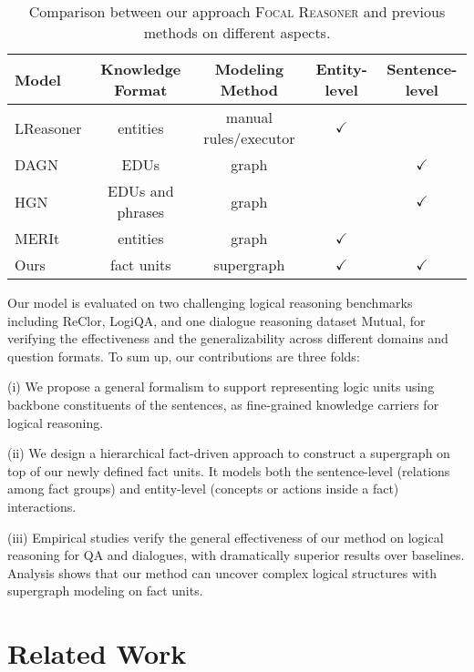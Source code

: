 \documentclass[11pt]{article}
\newcommand{\okmark}{{\textbf{\textcolor[rgb]{0.1, 0.5, 0.1}{$\checkmark$}}}}
\newcommand{\ngmark}{{\textbf{\color{red}{\ding{55}}}}}
\begin{document}
\begin{table*}
\centering
\setlength{\belowcaptionskip}{2 pt}
\small
\setlength{\tabcolsep}{9 pt}
\begin{tabular}{lcccc}
    \toprule
    Model    & Knowledge Format & Modeling Method & Entity-level & Sentence-level\\
    \midrule
    LReasoner \cite{wang2021logic} &entities&manual rules/executor&\okmark& \ngmark \\
    DAGN \cite{zhang2021video} & EDUs & graph &\ngmark &\okmark\\
    HGN \cite{chen-etal-2022-modeling-hierarchical} & EDUs and phrases & graph & \ngmark & \okmark\\
    MERIt \cite{jiao2022merit} & entities & graph &\okmark& \ngmark \\
    \midrule
    Ours & fact units & supergraph &\okmark &\okmark \\
    \bottomrule
\end{tabular}
  \caption{Comparison between our approach \textsc{Focal Reasoner} and previous methods on different aspects.}\label{related-work}
\vspace{-5mm}
\end{table*}

Our model is evaluated on two challenging logical reasoning benchmarks including ReClor\citep{yu2020reclor}, LogiQA\citep{ijcai2020-0501}, and one dialogue reasoning dataset Mutual, for verifying the effectiveness and the generalizability across different domains and question formats. To sum up, our contributions are three folds: 

(i) We propose a general formalism to support representing logic units using backbone constituents of the sentences, as fine-grained knowledge carriers for logical reasoning. 

(ii) We design a hierarchical fact-driven approach to construct a supergraph on top of our newly defined fact units. It models both the sentence-level (relations among fact groups) and entity-level (concepts or actions inside a fact) interactions.

(iii) Empirical studies verify the general effectiveness of our method on logical reasoning for QA and dialogues, with dramatically superior results over baselines. Analysis shows that our method can uncover complex logical structures with supergraph modeling on fact units.


\section{Related Work}
\label{gen_inst}
\end{document}
